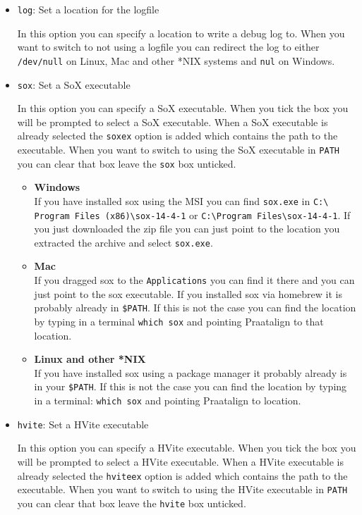 \begin{itemize}
	\item \texttt{log}: %
		Set a location for the logfile

		In this option you can specify a location to write a debug log to. When you
		want to switch to not using a logfile you can redirect the log to either
		\texttt{/dev/null} on Linux, Mac and other *NIX systems and \texttt{nul} on
		Windows.
	\item \texttt{sox}: %
		Set a SoX executable

		In this option you can specify a SoX executable. When you tick the box you
		will be prompted to select a SoX executable. When a SoX executable is
		already selected the \texttt{soxex} option is added which contains the path
		to the executable. When you want to switch to using the SoX executable in
		\texttt{PATH} you can clear that box leave the \texttt{sox} box unticked.

		\begin{itemize}
			\item \textbf{Windows}\\
				If you have installed sox using the MSI you can find \texttt{sox.exe}
				in \texttt{C:\textbackslash 
				Program Files (x86)\textbackslash sox-14-4-1} or
				\texttt{C:\textbackslash Program Files\textbackslash sox-14-4-1}.
				If you just downloaded the zip file you can just point to the location
				you extracted the archive and select \texttt{sox.exe}.
			\item \textbf{Mac}\\
				If you dragged sox to the \texttt{Applications} you can find it there
				and you can just point to the sox executable. If you installed sox via
				homebrew it is probably already in \texttt{\$PATH}. If this is not the
				case you can find the location by typing in a terminal \texttt{which
				sox} and pointing Praatalign to that location.
			\item \textbf{Linux and other *NIX}\\
				If you have installed sox using a package manager it probably already
				is in your \texttt{\$PATH}. If this is not the case you can find the
				location by typing in a terminal: \texttt{which sox} and pointing
				Praatalign to location.
		\end{itemize}
	\item \texttt{hvite}: %
		Set a HVite executable

		In this option you can specify a HVite executable. When you tick the box you
		will be prompted to select a HVite executable. When a HVite executable is
		already selected the \texttt{hviteex} option is added which contains the
		path to the executable. When you want to switch to using the HVite
		executable in \texttt{PATH} you can clear that box leave the \texttt{hvite}
		box unticked.


\end{itemize}
